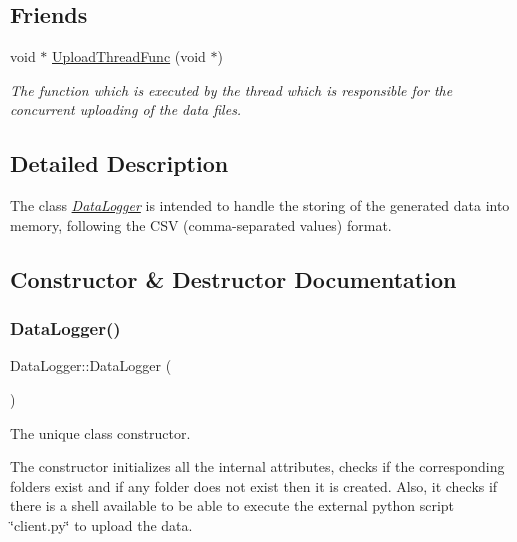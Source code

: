 \subsection*{Friends}
\begin{DoxyCompactItemize}
\item 
\mbox{\label{classDataLogger_a0cabdadaf836f897a111e72ab29d42f6}} 
void $\ast$ \hyperlink{classDataLogger_a0cabdadaf836f897a111e72ab29d42f6}{Upload\+Thread\+Func} (void $\ast$)
\begin{DoxyCompactList}\small\item\em The function which is executed by the thread which is responsible for the concurrent uploading of the data files. \end{DoxyCompactList}\end{DoxyCompactItemize}


\subsection{Detailed Description}
The class {\itshape \hyperlink{classDataLogger}{Data\+Logger}} is intended to handle the storing of the generated data into memory, following the C\+SV (comma-\/separated values) format. 

\subsection{Constructor \& Destructor Documentation}
\mbox{\label{classDataLogger_a7abebacd4747644d22982f9676466bad}} 
\subsubsection{\texorpdfstring{Data\+Logger()}{DataLogger()}}
{\footnotesize\ttfamily Data\+Logger\+::\+Data\+Logger (\begin{DoxyParamCaption}{ }\end{DoxyParamCaption})}



The unique class constructor. 

The constructor initializes all the internal attributes, checks if the corresponding folders exist and if any folder does not exist then it is created. Also, it checks if there is a shell available to be able to execute the external python script \char`\"{}client.\+py\char`\"{} to upload the data. 

